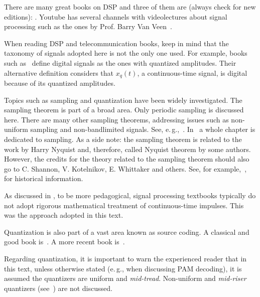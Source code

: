 There are many great books on DSP and three of them are (always check for new editions): \cite{Diniz10,Lyons10,Mitra10}. Youtube has several channels with videolectures about signal processing such as
the ones by Prof. Barry Van Veen~.


When reading DSP and telecommunication books, keep in mind that the taxonomy of signals adopted here is not the only one used. For example, books such as~\cite{Peebles86,Lathi98} define digital signals as the ones with quantized amplitudes. Their alternative definition considers that $x_q(t)$, a continuous-time signal, is digital because of its quantized amplitudes.

Topics such as sampling and quantization have been widely investigated.
The sampling theorem is part of a broad area. Only periodic sampling is discussed here. There are many other sampling theorems, addressing issues such as non-uniform sampling and non-bandlimited signals. See, e.\,g.,~\cite{Marvasti01,Benedetto01}. In~\cite{Peebles86} a whole chapter is dedicated to sampling. As a side note: the sampling theorem is related to the work by Harry Nyquist and, therefore, called Nyquist theorem by some authors. 
However, the credits for the theory related to the sampling theorem should also go to C. Shannon, V. Kotelnikov, E. Whittaker and others. See, for example,~\cite{Butzer92,Luke99}, for historical information. 

As discussed in \cite{Candan21}, to be more pedagogical, signal processing textbooks typically do not adopt rigorous mathematical treatment of continuous-time impulses. This was the approach adopted in this text.

Quantization is also part of a vast area known as source coding. A classical and good book is~\cite{Jayant84}. A more recent book is~\cite{Anderson07}.

Regarding quantization, it is important to warn the experienced reader that in this text, unless otherwise stated (e.\,g., when discussing PAM decoding), it is assumed the quantizers are uniform and \emph{mid-tread}. Non-uniform and \emph{mid-riser} quantizers (see~\cite{Jayant84}) are not discussed. 


